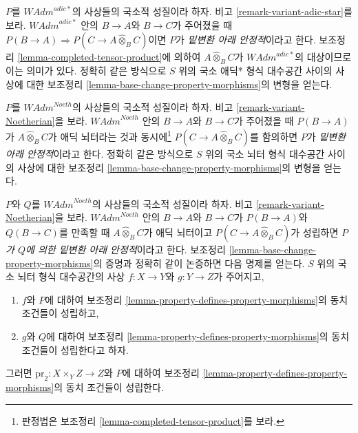 \begin{remark}[애딕* 변형]
\label{remark-base-change-variant-adic-star}
$P$를 $\textit{WAdm}^{adic*}$의 사상들의 국소적 성질이라 하자.
비고 \ref{remark-variant-adic-star}를 보라.
$\textit{WAdm}^{adic*}$ 안의 $B \to A$와 $B \to C$가 주어졌을 때
$P(B \to A) \Rightarrow P(C \to A \widehat{\otimes}_B C)$이면
$P$가 {\it 밑변환 아래 안정적}이라고 한다. 보조정리
\ref{lemma-completed-tensor-product}에 의하여
$A \widehat{\otimes}_B C$가 $\textit{WAdm}^{adic*}$의 대상이므로
이는 의미가 있다. 정확히 같은 방식으로 $S$ 위의 국소 애딕* 형식
대수공간 사이의 사상에 대한 보조정리
\ref{lemma-base-change-property-morphisms}의 변형을 얻는다.
\end{remark}

\begin{remark}[뇌터 변형]
\label{remark-base-change-variant-Noetherian}
$P$를 $\textit{WAdm}^{Noeth}$의 사상들의 국소적 성질이라 하자.
비고 \ref{remark-variant-Noetherian}을 보라.
$\textit{WAdm}^{Noeth}$ 안의 $B \to A$와 $B \to C$가 주어졌을 때
$P(B \to A)$가 $A \widehat{\otimes}_B C$가 애딕 뇌터라는 것과
동시에\footnote{판정법은 보조정리
\ref{lemma-completed-tensor-product}를 보라.}
$P(C \to A \widehat{\otimes}_B C)$를 함의하면 $P$가
{\it 밑변환 아래 안정적}이라고 한다. 정확히 같은 방식으로 $S$ 위의
국소 뇌터 형식 대수공간 사이의 사상에 대한 보조정리
\ref{lemma-base-change-property-morphisms}의 변형을 얻는다.
\end{remark}

\begin{remark}
\label{remark-base-change-variant-variant-Noetherian}
$P$와 $Q$를 $\textit{WAdm}^{Noeth}$의 사상들의 국소적 성질이라 하자.
비고 \ref{remark-variant-Noetherian}을 보라.
$\textit{WAdm}^{Noeth}$ 안의 $B \to A$와 $B \to C$가
$P(B \to A)$와 $Q(B \to C)$를 만족할 때
$A \widehat{\otimes}_B C$가 애딕 뇌터이고
$P(C \to A \widehat{\otimes}_B C)$가 성립하면
{\it $P$가 $Q$에 의한 밑변환 아래 안정적}이라고 한다.
보조정리 \ref{lemma-base-change-property-morphisms}의 증명과 정확히
같이 논증하면 다음 명제를 얻는다. $S$ 위의 국소 뇌터 형식
대수공간의 사상 $f : X \to Y$와 $g : Y \to Z$가 주어지고, %
\begin{enumerate}
\item $f$와 $P$에 대하여 보조정리
\ref{lemma-property-defines-property-morphisms}의 동치 조건들이
성립하고,
\item $g$와 $Q$에 대하여 보조정리
\ref{lemma-property-defines-property-morphisms}의 동치 조건들이
성립한다고 하자.
\end{enumerate}
그러면 $\text{pr}_2 : X \times_Y Z \to Z$와 $P$에 대하여 보조정리
\ref{lemma-property-defines-property-morphisms}의 동치 조건들이
성립한다.
\end{remark}

